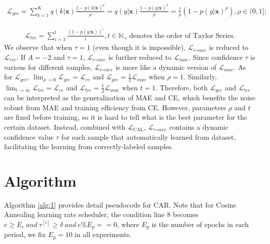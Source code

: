 \documentclass{article}
\begin{document}
\begin{align}
	\mathcal{L}_{gce}=\sum_{k=1}^{K}q(k|\bm{x})\frac{1-p(k|\bm{x})^{\rho}}{\rho}=q(y|\bm{x})\frac{1-p(y|\bm{x})^{\rho}}{\rho}=\frac{1}{\rho}(1-p(y|\bm{x})^{\rho}), \rho \in (0,1]; \nonumber
\end{align}


\begin{align}
	\mathcal{L}_{tce}=\sum_{i=1}^{t}\frac{(1-p(y|\bm{x}))^{i}}{i}, t \in \mathbb{N}_{+}\ \text{denotes the order of Taylor Series.} \nonumber
\end{align}
We observe that when $\tau=1$ (even though it is impossible), $\mathcal{L}_{r\textrm{-}cace}$ is reduced to $\mathcal{L}_{rce}$. If $A=-2$ and $\tau=1$, $\mathcal{L}_{r\textrm{-}cace}$ is further reduced to $\mathcal{L}_{mae}$. Since confidence $\tau$ is various for different samples, $\mathcal{L}_{r\textrm{-}cace}$ is more like a dynamic version of $\mathcal{L}_{mae}$. As for $\mathcal{L}_{gce}$, $\lim_{\rho \rightarrow 0}\mathcal{L}_{gce}=\mathcal{L}_{ce}$ and $\mathcal{L}_{gce}=\frac{1}{2}\mathcal{L}_{mae}$ when $\rho=1$. Similarly, $\lim_{t \rightarrow \infty}\mathcal{L}_{tce}=\mathcal{L}_{ce}$ and $\mathcal{L}_{tce}=\frac{1}{2}\mathcal{L}_{mae}$ when $t=1$. Therefore, both $\mathcal{L}_{gce}$ and $\mathcal{L}_{tce}$ can be interpreted as the generalization of MAE and CE, which benefits the noise robust from MAE and training efficiency from CE. However, parameters $\rho$ and $t$ are fixed before training, so it is hard to tell what is the best parameter for the certain dataset. Instead, combined with $\mathcal{L}_\text{CAL}$, $\mathcal{L}_{r\textrm{-}cace}$ contains a dynamic confidence value $\tau$ for each sample that automatically learned from dataset, facilitating the learning from correctly-labeled samples.


\section{Algorithm}

Algorithm \ref{alg:1} provides detail pseudocode for CAR. Note that for Cosine Annealing learning rate scheduler, the condition line 8 becomes $e \ge E_{c}\ and\ \tau^{[i]} \ge \delta \ and\ e\%E_{p}==0$, where $E_{p}$ is the number of epochs in each period, we fix $E_{p}=10$ in all experiments. 
\end{document}

